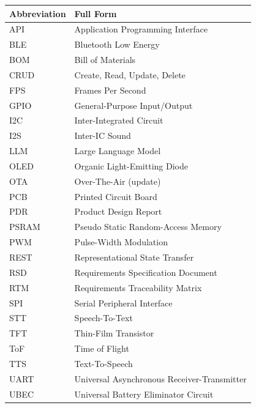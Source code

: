 \documentclass[12pt,a4paper]{article}
\begin{document}
\begin{center}
\begin{tabular}{|L{0.18\textwidth}|L{0.70\textwidth}|}
\hline
\textbf{Abbreviation} & \textbf{Full Form} \\ \hline
API & Application Programming Interface \\ \hline
BLE & Bluetooth Low Energy \\ \hline
BOM & Bill of Materials \\ \hline
CRUD & Create, Read, Update, Delete \\ \hline
FPS & Frames Per Second \\ \hline
GPIO & General-Purpose Input/Output \\ \hline
I2C & Inter-Integrated Circuit \\ \hline
I2S & Inter-IC Sound \\ \hline
LLM & Large Language Model \\ \hline
OLED & Organic Light-Emitting Diode \\ \hline
OTA & Over-The-Air (update) \\ \hline
PCB & Printed Circuit Board \\ \hline
PDR & Product Design Report \\ \hline
PSRAM & Pseudo Static Random-Access Memory \\ \hline
PWM & Pulse-Width Modulation \\ \hline
REST & Representational State Transfer \\ \hline
RSD & Requirements Specification Document \\ \hline
RTM & Requirements Traceability Matrix \\ \hline
SPI & Serial Peripheral Interface \\ \hline
STT & Speech-To-Text \\ \hline
TFT & Thin-Film Transistor \\ \hline
ToF & Time of Flight \\ \hline
TTS & Text-To-Speech \\ \hline
UART & Universal Asynchronous Receiver-Transmitter \\ \hline
UBEC & Universal Battery Eliminator Circuit \\ \hline
\end{tabular}
\end{center}

\tableofcontents
\listoffigures
\listoftables

\newpage
\end{document}
